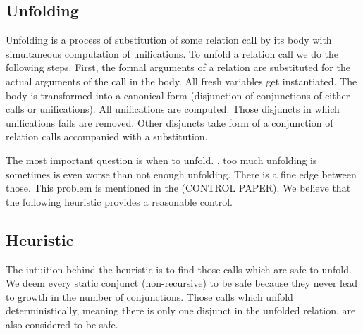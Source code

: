 \subsection{Unfolding}

Unfolding is a process of substitution of some relation call by its body with simultaneous computation of unifications.
To unfold a relation call we do the following steps.
First, the formal arguments of a relation are substituted for the actual arguments of the call in the body.
All fresh variables get instantiated.
The body is transformed into a canonical form (disjunction of conjunctions of either calls or unifications).
All unifications are computed.
Those disjuncts in which unifications fails are removed.
Other disjuncts take form of a conjunction of relation calls accompanied with a substitution.

The most important question is when to unfold.
, too much unfolding is sometimes is even worse than not enough unfolding.
There is a fine edge between those.
This problem is mentioned in the (CONTROL PAPER).
We believe that the following heuristic provides a reasonable control.

\subsection{Heuristic}

The intuition behind the heuristic is to find those calls which are safe to unfold.
We deem every static conjunct (non-recursive) to be safe because they never lead to growth in the number of conjunctions.
Those calls which unfold deterministically, meaning there is only one disjunct in the unfolded relation, are also considered to be safe.

